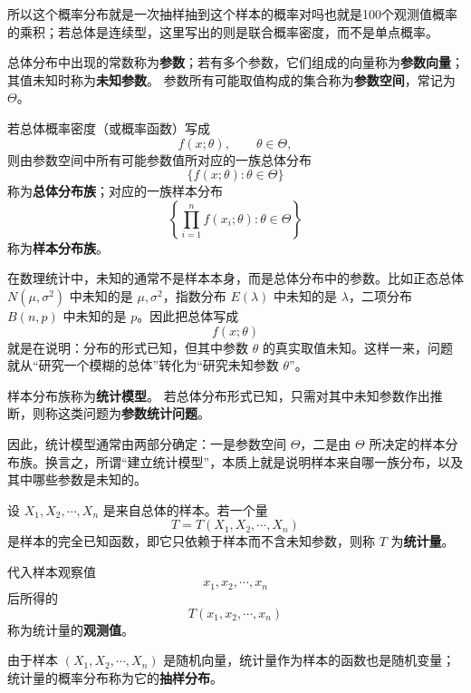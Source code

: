 \begin{note}
所以这个概率分布就是一次抽样抽到这个样本的概率对吗也就是100个观测值概率的乘积；若总体是连续型，这里写出的则是联合概率密度，而不是单点概率。
\end{note}
\begin{definition}[参数、参数空间与分布族]
总体分布中出现的常数称为\textbf{参数}；若有多个参数，它们组成的向量称为\textbf{参数向量}；其值未知时称为\textbf{未知参数}。  
参数所有可能取值构成的集合称为\textbf{参数空间}，常记为 \(\Theta\)。

若总体概率密度（或概率函数）写成
\[
f(x;\theta),\qquad \theta\in\Theta,
\]
则由参数空间中所有可能参数值所对应的一族总体分布
\[
\{f(x;\theta):\theta\in\Theta\}
\]
称为\textbf{总体分布族}；对应的一族样本分布
\[
\left\{\prod_{i=1}^n f(x_i;\theta):\theta\in\Theta\right\}
\]
称为\textbf{样本分布族}。
\end{definition}
\begin{note}
在数理统计中，未知的通常不是样本本身，而是总体分布中的参数。比如正态总体 \(N(\mu,\sigma^2)\) 中未知的是 \(\mu,\sigma^2\)，指数分布 \(E(\lambda)\) 中未知的是 \(\lambda\)，二项分布 \(B(n,p)\) 中未知的是 \(p\)。因此把总体写成
\[
f(x;\theta)
\]
就是在说明：分布的形式已知，但其中参数 \(\theta\) 的真实取值未知。这样一来，问题就从“研究一个模糊的总体”转化为“研究未知参数 \(\theta\)”。
\end{note}
\begin{definition}[统计模型与参数统计问题]
样本分布族称为\textbf{统计模型}。  
若总体分布形式已知，只需对其中未知参数作出推断，则称这类问题为\textbf{参数统计问题}。
\end{definition}

\begin{note}
因此，统计模型通常由两部分确定：一是参数空间 \(\Theta\)，二是由 \(\Theta\) 所决定的样本分布族。换言之，所谓“建立统计模型”，本质上就是说明样本来自哪一族分布，以及其中哪些参数是未知的。
\end{note}
\begin{definition}[统计量与抽样分布]
设 \(X_1,X_2,\cdots,X_n\) 是来自总体的样本。若一个量
\[
T=T(X_1,X_2,\cdots,X_n)
\]
是样本的完全已知函数，即它只依赖于样本而不含未知参数，则称 \(T\) 为\textbf{统计量}。

代入样本观察值
\[
x_1,x_2,\cdots,x_n
\]
后所得的
\[
T(x_1,x_2,\cdots,x_n)
\]
称为统计量的\textbf{观测值}。

由于样本 \((X_1,X_2,\cdots,X_n)\) 是随机向量，统计量作为样本的函数也是随机变量；统计量的概率分布称为它的\textbf{抽样分布}。
\end{definition}

